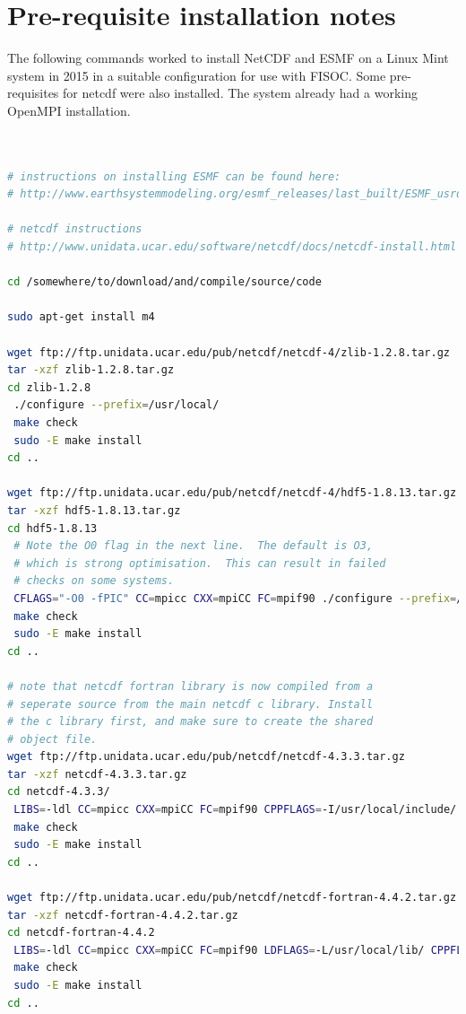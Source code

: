 \documentclass[11pt]{article}
\begin{document}
\section{Pre-requisite installation notes}
\label{app:A}
The following commands worked to install NetCDF and ESMF on a Linux Mint system in 2015 
in a suitable configuration for use with FISOC. 
Some pre-requisites for netcdf were also installed.
The system already had a working OpenMPI installation.



\begin{lstlisting}[language=bash]


# instructions on installing ESMF can be found here:
# http://www.earthsystemmodeling.org/esmf_releases/last_built/ESMF_usrdoc/node9.html

# netcdf instructions
# http://www.unidata.ucar.edu/software/netcdf/docs/netcdf-install.html

cd /somewhere/to/download/and/compile/source/code

sudo apt-get install m4

wget ftp://ftp.unidata.ucar.edu/pub/netcdf/netcdf-4/zlib-1.2.8.tar.gz
tar -xzf zlib-1.2.8.tar.gz 
cd zlib-1.2.8
 ./configure --prefix=/usr/local/
 make check
 sudo -E make install
cd ..

wget ftp://ftp.unidata.ucar.edu/pub/netcdf/netcdf-4/hdf5-1.8.13.tar.gz	
tar -xzf hdf5-1.8.13.tar.gz 
cd hdf5-1.8.13
 # Note the O0 flag in the next line.  The default is O3, 
 # which is strong optimisation.  This can result in failed 
 # checks on some systems.
 CFLAGS="-O0 -fPIC" CC=mpicc CXX=mpiCC FC=mpif90 ./configure --prefix=/usr/local/ --with-zlib=/usr/local  --enable-fortran --enable-parallel --enable-shared
 make check
 sudo -E make install
cd ..

# note that netcdf fortran library is now compiled from a 
# seperate source from the main netcdf c library. Install 
# the c library first, and make sure to create the shared
# object file. 
wget ftp://ftp.unidata.ucar.edu/pub/netcdf/netcdf-4.3.3.tar.gz
tar -xzf netcdf-4.3.3.tar.gz 
cd netcdf-4.3.3/
 LIBS=-ldl CC=mpicc CXX=mpiCC FC=mpif90 CPPFLAGS=-I/usr/local/include/ LDFLAGS=-L/usr/local/lib/  ./configure --prefix=/usr/local --enable-parallel 
 make check
 sudo -E make install
cd ..

wget ftp://ftp.unidata.ucar.edu/pub/netcdf/netcdf-fortran-4.4.2.tar.gz
tar -xzf netcdf-fortran-4.4.2.tar.gz 
cd netcdf-fortran-4.4.2
 LIBS=-ldl CC=mpicc CXX=mpiCC FC=mpif90 LDFLAGS=-L/usr/local/lib/ CPPFLAGS="-I/usr/local/include -DUSE_NETCDF4"  ./configure --prefix=/usr/local
 make check
 sudo -E make install
cd ..


\end{lstlisting}
\end{document}
